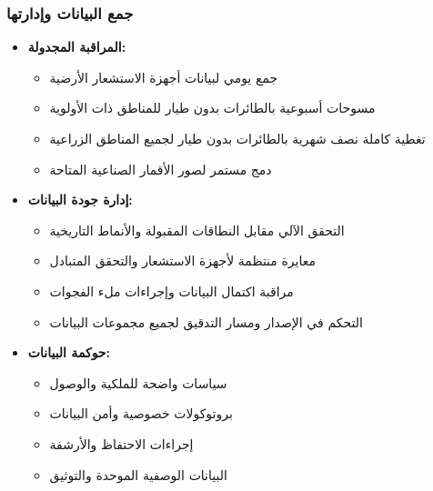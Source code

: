 \subsubsection{جمع البيانات وإدارتها}
\begin{itemize}
    \item \textbf{المراقبة المجدولة:}
    \begin{itemize}
        \item جمع يومي لبيانات أجهزة الاستشعار الأرضية
        \item مسوحات أسبوعية بالطائرات بدون طيار للمناطق ذات الأولوية
        \item تغطية كاملة نصف شهرية بالطائرات بدون طيار لجميع المناطق الزراعية
        \item دمج مستمر لصور الأقمار الصناعية المتاحة
    \end{itemize}
    
    \item \textbf{إدارة جودة البيانات:}
    \begin{itemize}
        \item التحقق الآلي مقابل النطاقات المقبولة والأنماط التاريخية
        \item معايرة منتظمة لأجهزة الاستشعار والتحقق المتبادل
        \item مراقبة اكتمال البيانات وإجراءات ملء الفجوات
        \item التحكم في الإصدار ومسار التدقيق لجميع مجموعات البيانات
    \end{itemize}
    
    \item \textbf{حوكمة البيانات:}
    \begin{itemize}
        \item سياسات واضحة للملكية والوصول
        \item بروتوكولات خصوصية وأمن البيانات
        \item إجراءات الاحتفاظ والأرشفة
        \item البيانات الوصفية الموحدة والتوثيق
    \end{itemize}
\end{itemize}

